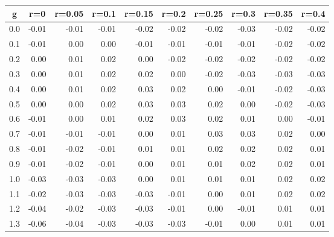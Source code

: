 %
\begin{table}[!tbp]
 \begin{center}
 \begin{tabular}{rrrrrrrrrr}\hline\hline
\multicolumn{1}{c}{g}&\multicolumn{1}{c}{r=0}&\multicolumn{1}{c}{r=0.05}&\multicolumn{1}{c}{r=0.1}&\multicolumn{1}{c}{r=0.15}&\multicolumn{1}{c}{r=0.2}&\multicolumn{1}{c}{r=0.25}&\multicolumn{1}{c}{r=0.3}&\multicolumn{1}{c}{r=0.35}&\multicolumn{1}{c}{r=0.4}\tabularnewline
\hline
0.0&-0.01&-0.01&-0.01&-0.02&-0.02&-0.02&-0.03&-0.02&-0.02\tabularnewline
0.1&-0.01& 0.00& 0.00&-0.01&-0.01&-0.01&-0.01&-0.02&-0.02\tabularnewline
0.2& 0.00& 0.01& 0.02& 0.00&-0.02&-0.02&-0.02&-0.02&-0.02\tabularnewline
0.3& 0.00& 0.01& 0.02& 0.02& 0.00&-0.02&-0.03&-0.03&-0.03\tabularnewline
0.4& 0.00& 0.01& 0.02& 0.03& 0.02& 0.00&-0.01&-0.02&-0.03\tabularnewline
0.5& 0.00& 0.00& 0.02& 0.03& 0.03& 0.02& 0.00&-0.02&-0.03\tabularnewline
0.6&-0.01& 0.00& 0.01& 0.02& 0.03& 0.02& 0.01& 0.00&-0.01\tabularnewline
0.7&-0.01&-0.01&-0.01& 0.00& 0.01& 0.03& 0.03& 0.02& 0.00\tabularnewline
0.8&-0.01&-0.02&-0.01& 0.01& 0.01& 0.02& 0.02& 0.02& 0.01\tabularnewline
0.9&-0.01&-0.02&-0.01& 0.00& 0.01& 0.01& 0.02& 0.02& 0.01\tabularnewline
1.0&-0.03&-0.03&-0.03& 0.00& 0.01& 0.01& 0.01& 0.02& 0.02\tabularnewline
1.1&-0.02&-0.03&-0.03&-0.03&-0.01& 0.00& 0.01& 0.02& 0.02\tabularnewline
1.2&-0.04&-0.02&-0.03&-0.03&-0.01& 0.00&-0.01& 0.01& 0.01\tabularnewline
1.3&-0.06&-0.04&-0.03&-0.03&-0.03&-0.01& 0.00& 0.01& 0.01\tabularnewline
\hline
\end{tabular}

\end{center}

\end{table}

